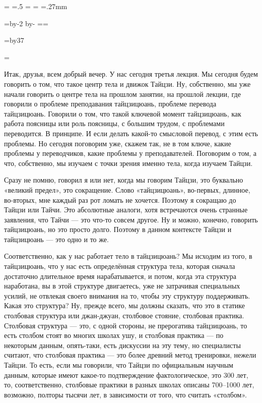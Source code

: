 \pdfpagewidth=297mm
\pdfpageheight=210mm
\pdfhorigin=1in
\pdfvorigin=0pt

\shhtotal=\pdfpagewidth
\htotal=.5\shhtotal
\vtotal=\pdfpageheight
\shoutline=0pt
\shstaplewidth=0pt
\shcrop=0pt
\shfootline={}
\shthickness=.27mm
\qtwopages \shipout\vbox{}

\horigin=10mm
\hsize=\htotal \advance\hsize by-2\horigin
\advance\hsize by-\QUIRE
\output={\ifodd\pageno\else\hoffset=\QUIRE\fi \plainoutput}

\vorigin=7mm
\vsize=\topskip \advance\vsize by37\baselineskip

\footline={\line{\hss\tenrm\folio\hss}}


Итак, друзья, всем добрый вечер. У нас сегодня третья лекция. Мы сегодня будем говорить о том, 
что такое центр тела и движок Тайцзи. Ну, собственно, мы уже начали говорить о центре тела на 
прошлом занятии, на прошлой лекции, где говорили о проблеме преподавания тайцзицюань, 
проблеме перевода тайцзицюань. Говорили о том, что такой ключевой момент тайцзицюань, как 
работа поясницы или роль поясницы, с большим трудом, с проблемами переводится. В принципе. И 
если делать какой-то смысловой перевод, с этим есть проблемы. Но сегодня поговорим уже, 
скажем так, не в том ключе, какие проблемы у переводчиков, какие проблемы у преподавателей.
Поговорим о том, а что, собственно, мы изучаем с точки зрения именно тела, когда изучаем 
Тайцзи.

Сразу не помню, говорил я или нет, когда мы говорим Тайцзи, это буквально 
«великий предел», это сокращение. Слово «тайцзицюань», во-первых, длинное, во-вторых, мне каждый 
раз рот ломать не хочется. Поэтому я сокращаю до Тайцзи или Тайчи. Это абсолютные аналоги, 
хотя встречаются очень странные заявления, что Тайчи --- это что-то совсем другое. Ну и можно, 
конечно, говорить тайцзицюань, но это просто долго. Поэтому в данном контексте Тайцзи и 
тайцзицюань --- это одно и то же.

Соответственно, как у нас работает тело в тайцзицюань? Мы 
исходим из того, в тайцзицюань, что у нас есть определённая структура тела, которая сначала 
достаточно длительное время нарабатывается, и потом, когда эта структура наработана, вы в 
этой структуре двигаетесь, уже не затрачивая специальных усилий, не отвлекая своего 
внимания на то, чтобы эту структуру поддерживать. Какая это структура? Ну, прежде всего, мы 
должны сказать, что это в статике столбовая структура или джан-джуан, столбовое стояние, 
столбовая практика. Столбовая структура --- это, с одной стороны, не прерогатива тайцзицюань, 
то есть столбом стоят во многих школах ушу, и столбовая практика --- по некоторым данным, 
опять-таки, есть дискуссии на эту тему, но специалисты считают, что столбовая практика --- это 
более древний метод тренировки, нежели Тайцзи. То есть, если мы говорили, что Тайцзи по 
официальным научным данным, которые имеют какое-то подтверждение фактологическое, это 300 
лет, то, соответственно, столбовые практики в разных школах описаны 700--1000 лет, возможно, 
полторы тысячи лет, в зависимости от того, что считать «столбом».


